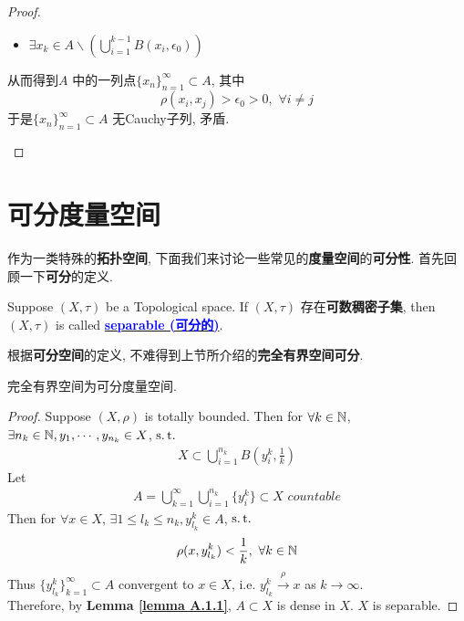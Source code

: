 \begin{thm}
\begin{proof}
\begin{enumerate}
\begin{itemize}
					\item $\exists x_k \in A \backslash \left( \bigcup_{i = 1}^{k - 1}{B(x_i , \epsilon_0)} \right)$
				\end{itemize}
			
				\vspace*{1em}
				
				从而得到$A$ 中的一列点$\{ x_n \}_{n = 1}^{\infty} \subset A$, 其中
				\[ \rho(x_i , x_j) > \epsilon_0 > 0 , \,\, \forall i \neq j \]
				于是$\{ x_n \}_{n = 1}^{\infty} \subset A$ 无Cauchy子列, 矛盾.
			\end{enumerate}
		\end{proof}
	\end{thm}

\newpage

\section{可分度量空间}
	作为一类特殊的\textbf{拓扑空间}, 下面我们来讨论一些常见的\textbf{度量空间}的\textbf{可分性}. 首先回顾一下\textbf{可分}的定义.
	\begin{defn}\label{def 1.5.1}
		Suppose $(X , \tau)$ be a Topological space. If $(X , \tau)$ 存在\textbf{可数稠密子集}, then $(X , \tau)$ is called \underline{\textcolor{blue}{\textbf{separable (可分的)}}}.
	\end{defn}
	
	\vspace*{6em}
	
	根据\textbf{可分空间}的定义, 不难得到上节所介绍的\textbf{完全有界空间可分}.
	
	\begin{proposition}\label{prop 1.5.1}
		完全有界空间为可分度量空间.
		
		\vspace*{4em}
		
		\begin{proof}
			Suppose $(X , \rho)$ is totally bounded. Then for $\forall k \in \mathbb{N}$, $\exists n_k \in \mathbb{N} ,  y_{1} , \cdots , y_{n_k} \in X$, $\operatorname{s.t.}$
			\begin{align}
				X \subset \bigcup_{i = 1}^{n_k}{B(y_{i}^k , \frac{1}{k})}
			\end{align}
			Let
			\begin{align}
				A = \bigcup_{k = 1}^{\infty} \bigcup_{i = 1}^{n_k}{\{ y_{i}^k \}} \subset X \,\, countable
			\end{align}
			Then for $\forall x \in X$, $\exists 1 \leq l_k \leq n_k , y_{l_k}^{k} \in A$, $\operatorname{s.t.}$
			\[ \rho(x , y_{l_k}^k) < \dfrac{1}{k} , \,\, \forall k \in \mathbb{N} \]
			Thus $\{ y_{l_k}^k \}_{k = 1}^{\infty} \subset A$ convergent to $x \in X$, i.e. $y_{l_k}^k \overset{\rho}{\to} x$ as $k \to \infty$. \\
			Therefore, by \textbf{Lemma \ref{lemma A.1.1}}, $A \subset X$ is dense in $X$. $X$ is separable.
		\end{proof}
	\end{proposition}
	
